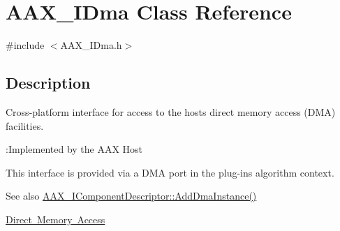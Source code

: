\hypertarget{a01809}{}\section{A\+A\+X\+\_\+\+I\+Dma Class Reference}
\label{a01809}


{\ttfamily \#include $<$A\+A\+X\+\_\+\+I\+Dma.\+h$>$}



\subsection{Description}
Cross-\/platform interface for access to the host\textquotesingle{}s direct memory access (D\+MA) facilities. 

\begin{DoxyRefDesc}{\+:\+Implemented by the A\+A\+X Host}
\item[\mbox{\hyperlink{a00790__aax_host_implementation000005}{\+:\+Implemented by the A\+A\+X Host}}]\end{DoxyRefDesc}


This interface is provided via a D\+MA port in the plug-\/in\textquotesingle{}s algorithm context.

\begin{DoxySeeAlso}{See also}
\mbox{\hyperlink{a01781_aff9e1c726bbdf500f2d61b164589744e}{A\+A\+X\+\_\+\+I\+Component\+Descriptor\+::\+Add\+Dma\+Instance()}} 

\mbox{\hyperlink{a00810}{Direct Memory Access}} 
\end{DoxySeeAlso}
